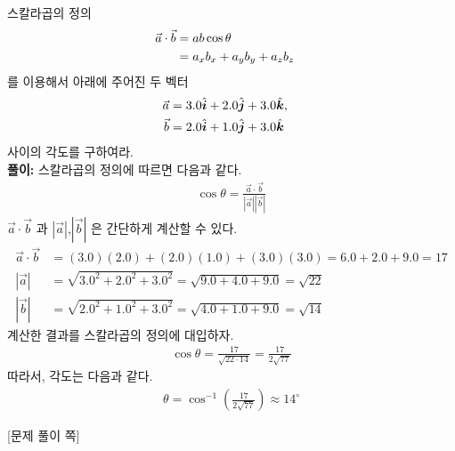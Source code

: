 \documentclass[floatfix,nofootinbib,superscriptaddress,fleqn,preprint]{revtex4-2}
\begin{document}
 스칼라곱의 정의
\begin{align}
\vec{a}\cdot\vec{b} &= ab\cos\theta  \cr
&=a_xb_x + a_yb_y + a_z b_z 
\end{align}
를 이용해서 아래에 주어진 두 벡터
\begin{align}
\vec{a} &= 3.0\hat{\bm{i}} + 2.0\hat{\bm{j}} + 3.0\hat{\bm{k}},\cr
\vec{b} &= 2.0\hat{\bm{i}} + 1.0\hat{\bm{j}} + 3.0\hat{\bm{k}}
\end{align}
사이의 각도를 구하여라. \\
\noindent \textbf{풀이:} 스칼라곱의 정의에 따르면 다음과 같다.
\begin{align}
  \cos\theta=\frac{\vec{a}\cdot\vec{b}}{|\vec{a}||\vec{b}|}
\end{align}
$\vec{a}\cdot\vec{b}$ 과 $|\vec{a}|$,$|\vec{b}|$ 은 간단하게 계산할 수 있다. 
\begin{align*}
  \vec{a}\cdot\vec{b} &= (3.0)(2.0)+(2.0)(1.0)+(3.0)(3.0) = 6.0+2.0+9.0 = 17 \\
  |\vec{a}|&=\sqrt{{3.0}^2+{2.0}^2+{3.0}^2}=\sqrt{9.0+4.0+9.0}=\sqrt{22} \\
  |\vec{b}|&=\sqrt{{2.0}^2+{1.0}^2+{3.0}^2}=\sqrt{4.0+1.0+9.0}=\sqrt{14}
\end{align*}
계산한 결과를 스칼라곱의 정의에 대입하자.
\begin{align*}
  \cos\theta = \frac{17}{\sqrt{22\cdot 14}}=\frac{17}{2\sqrt{77}}
\end{align*}
따라서, 각도는 다음과 같다.
\begin{align*}
  \theta = \cos^{-1}\left(\frac{17}{2\sqrt{77}}\right) \approx 14^{\circ}
\end{align*}

\newpage

{\color{gray} [문제 풀이 쪽]}

\newpage 
\end{document}
